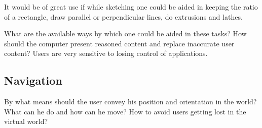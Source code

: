 It would be of great use if while sketching one could be aided in keeping the ratio of
a rectangle, draw parallel or perpendicular lines, do extrusions and lathes.

What are the available ways by which one could be aided in these tasks?
How should the computer present reasoned content and replace inaccurate user content?
Users are very sensitive to losing control of applications.


\subsection{Navigation}
By what means should the user convey his position and orientation in the world?
What can he do and how can he move?
How to avoid users getting lost in the virtual world?

